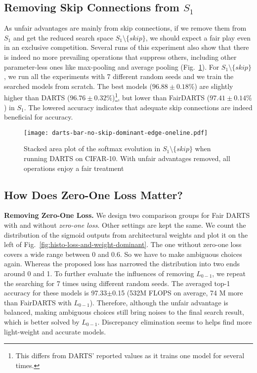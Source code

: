 \documentclass[runningheads]{llncs}
\begin{document}
\subsection{Removing Skip Connections from $S_1$}
As unfair advantages are mainly from skip connections, if we remove them from $S_1$ and get the reduced search space $S_1\setminus\{skip\}$, we should expect a fair play even in an exclusive competition. Several runs of this experiment also show that there is indeed no more prevailing operations that suppress others, including other parameter-less ones like max-pooling and average pooling (Fig.~\ref{fig:darts-bar-no-skip-dominant-edge}). For $S_1\setminus\{skip\}$, we run all the experiments with 7 different random seeds and we train the searched models from scratch. The best models ($96.88\pm0.18\%$) are slightly higher than  DARTS ($96.76\pm0.32\%$)\footnote{This differs from DARTS' reported values as it trains one model for several times.}, but lower than FairDARTS ($97.41\pm0.14\%$) in  $S_1$. The lowered accuracy indicates that adequate  skip connections are indeed beneficial for accuracy.
\begin{figure}[ht]
	\centering
	\texttt{[image: darts-bar-no-skip-dominant-edge-oneline.pdf]}
\caption{Stacked area plot of the softmax evolution in  $S_1\setminus\{skip\}$ when running DARTS on CIFAR-10. With unfair advantages removed, all operations enjoy a fair treatment}
	\label{fig:darts-bar-no-skip-dominant-edge}
\end{figure}

\subsection{How Does Zero-One Loss Matter?}\label{sec:zero-one-loss}

\textbf{Removing Zero-One Loss.} We design two comparison groups for Fair DARTS with and without \emph{zero-one loss}. Other settings are kept the same. We count the distribution of the sigmoid outputs from architectural weights and plot it on the left of Fig.~\ref{fig:histo-loss-and-weight-dominant}.  The one without zero-one loss covers a wide range between 0 and 0.6. So we have to make ambiguous choices again. Whereas the proposed loss has narrowed the distribution into two ends around 0 and 1. To further evaluate the influences of removing $L_{0-1}$, we repeat the searching for 7 times using different random seeds. The averaged top-1 accuracy for these models is 97.33$\pm$0.15 (532M FLOPS on average, 74 M more than FairDARTS with $L_{0-1}$). 
Therefore, although the unfair advantage is balanced, making ambiguous choices still bring noises to the final search result, which is better solved by $L_{0-1}$. Discrepancy elimination seems to helps find more light-weight and accurate models.
\end{document}
